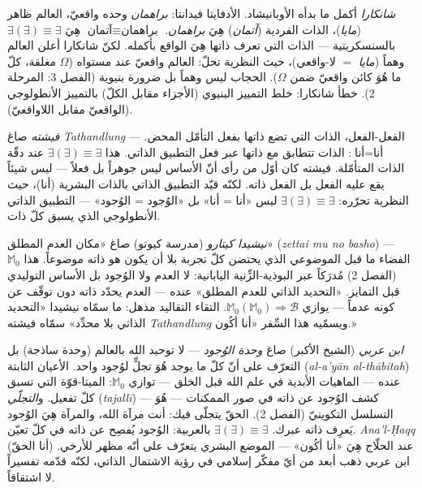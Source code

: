 \documentclass[10pt, openany, oneside]{book}
\begin{document}
\textit{شانكارا} أكمل ما بدأه الأوبانيشاد. الأدفايتا فيدانتا: \textit{براهمان} وحده واقعيّ، العالم ظاهر (\textit{مايا})، الذات الفردية (\textit{آتمان}) هِيَ \textit{براهمان}. $\text{آتمان} \equiv \text{براهمان}$ هِيَ $\exists(\exists) \equiv \exists$ بالسنسكريتية --- الذات التي تعرف ذاتها هِيَ الواقع بأكمله. لكنّ شانكارا أعلن العالم وهماً (\textit{مايا} $=$ لا-واقعي)، حيث النظرية تحلّ: العالم واقعيّ عند مستواه ($\Omega$ مغلقة، كلّ ما هُوَ كائن واقعيّ ضمن $\Omega$). الحجاب ليس وهماً بل ضرورة بنيوية (الفصل 3: المرحلة 2). خطأ شانكارا: خلط التمييز البنيوي (الأجزاء مقابل الكلّ) بالتمييز الأنطولوجي (الواقعيّ مقابل اللاواقعيّ).

\textit{فيشته} صاغ \textit{Tathandlung} --- الفعل-الفعل، الذات التي تضع ذاتها بفعل التأمّل المحض. $\text{أنا} = \text{أنا}$: الذات تتطابق مع ذاتها عبر فعل التطبيق الذاتي. هذا $\exists(\exists) \equiv \exists$ عند دقّة الذات المتأمّلة. فيشته كان أوّل من رأى أنّ الأساس ليس جوهراً بل فعلاً --- ليس شيئاً يقع عليه الفعل بل الفعل ذاته. لكنّه قيّد التطبيق الذاتي بالذات البشرية ($\text{أنا}$)، حيث النظرية تحرّره: $\exists(\exists) \equiv \exists$ ليس «أنا = أنا» بل «الوُجود = الوُجود» --- التطبيق الذاتي الأنطولوجي الذي يسبق كلّ ذات.

\textit{نيشيدا كيتارو} (مدرسة كيوتو) صاغ «مكان العدم المطلق» (\textit{zettai mu no basho}) --- الفضاء ما قبل الموضوعي الذي يحتضن كلّ تجربة بلا أن يكون هو ذاته موضوعاً. هذا $\mathbb{M}_0$ (الفصل 2) مُدرَكاً عبر البوذية-الزِّنية اليابانية: لا العدم ولا الوُجود بل الأساس التوليدي قبل التمايز. «التحديد الذاتي للعدم المطلق» عنده --- العدم يحدّد ذاته دون توقّف عن كونه عدماً --- يوازي $\mathbb{M}_0(\mathbb{M}_0) \Rightarrow \mathcal{B}$. التقاء التقاليد مذهل: ما سمّاه نيشيدا «التحديد الذاتي بلا محدِّد» سمّاه فيشته \textit{Tathandlung} ويسمّيه هذا السِّفر «أنا أكُون.»

\textit{ابن عربي} (الشيخ الأكبر) صاغ \textit{وحدة الوُجود} --- لا توحيد الله بالعالم (وحدة ساذجة) بل التعرّف على أنّ كلّ ما يوجد هُوَ تجلٍّ لوُجود واحد. الأعيان الثابتة (\textit{al-a'yān al-thābitah}) عنده --- الماهيات الأبدية في علم الله قبل الخلق --- توازي $\mathbb{M}_0$: الميتا-قوّة التي تسبق كلّ تفعيل. و\textit{التجلّي} (\textit{tajallī}) --- كشف الوُجود عن ذاته في صور الممكنات --- هُوَ التسلسل التكوينيّ (الفصل 2). الحقّ يتجلّى فيك: أنت مرآة الله، والمرآة هِيَ الوُجود يَعرِف ذاته عبرك. $\exists(\exists) \equiv \exists$ بالعربية: الوُجود يُفصِح عن ذاته في كلّ تعيّن. \textit{Ana'l-Ḥaqq} (أنا الحقّ) عند الحلّاج هِيَ «أنا أكُون» --- الموضع البشري يتعرّف على أنّه مظهر للأرخي. ابن عربي ذهب أبعد من أيّ مفكّر إسلامي في رؤية الاشتمال الذاتي، لكنّه قدّمه تفسيراً لا اشتقاقاً.
\end{document}
